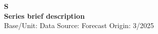 \documentclass[a4paper,10pt]{article}
\begin{document}
\thispagestyle{empty}
\begin{landscape}
\begin{center}

\textbf{S} \\ 

\textbf{Series brief description} \\ 

Base/Unit: 
\space \space \space Data Source:  
\space \space \space Forecast Origin: 3/2025 \\ 
\end{center}

\begin{footnotesize} \singlespacing  \end{footnotesize} 

\end{landscape}
\end{document}
